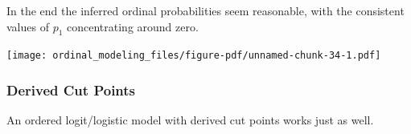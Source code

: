 \documentclass[
  letterpaper,
  DIV=11,
  numbers=noendperiod]{scrartcl}
\newenvironment{Shaded}{\begin{snugshade}}{\end{snugshade}}
\newcommand{\AttributeTok}[1]{\textcolor[rgb]{0.40,0.45,0.13}{#1}}
\newcommand{\ControlFlowTok}[1]{\textcolor[rgb]{0.00,0.23,0.31}{#1}}
\newcommand{\DecValTok}[1]{\textcolor[rgb]{0.68,0.00,0.00}{#1}}
\newcommand{\FunctionTok}[1]{\textcolor[rgb]{0.28,0.35,0.67}{#1}}
\newcommand{\NormalTok}[1]{\textcolor[rgb]{0.00,0.23,0.31}{#1}}
\newcommand{\OtherTok}[1]{\textcolor[rgb]{0.00,0.23,0.31}{#1}}
\newcommand{\SpecialCharTok}[1]{\textcolor[rgb]{0.37,0.37,0.37}{#1}}
\newcommand{\StringTok}[1]{\textcolor[rgb]{0.13,0.47,0.30}{#1}}
\begin{document}
In the end the inferred ordinal probabilities seem reasonable, with the
consistent values of \(p_{1}\) concentrating around zero.

\begin{Shaded}
\end{Shaded}

\texttt{[image: ordinal\_modeling\_files/figure-pdf/unnamed-chunk-34-1.pdf]}

\subsubsection{Derived Cut Points}\label{derived-cut-points-1}

An ordered logit/logistic model with derived cut points works just as
well.
\end{document}
